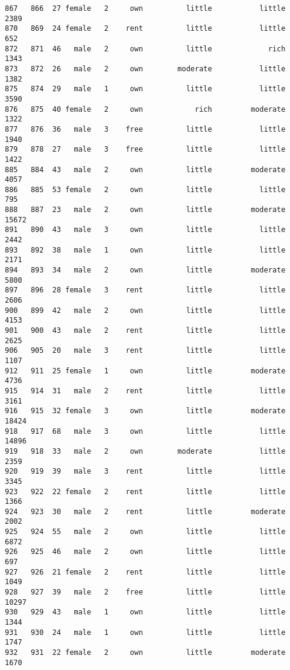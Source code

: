 \documentclass[
]{article}
\begin{document}
\begin{verbatim}
867   866  27 female   2     own          little           little          2389
870   869  24 female   2    rent          little           little           652
872   871  46   male   2     own          little             rich          1343
873   872  26   male   2     own        moderate           little          1382
875   874  29   male   1     own          little           little          3590
876   875  40 female   2     own            rich         moderate          1322
877   876  36   male   3    free          little           little          1940
879   878  27   male   3    free          little           little          1422
885   884  43   male   2     own          little         moderate          4057
886   885  53 female   2     own          little           little           795
888   887  23   male   2     own          little         moderate         15672
891   890  43   male   3     own          little           little          2442
893   892  38   male   1     own          little           little          2171
894   893  34   male   2     own          little         moderate          5800
897   896  28 female   3    rent          little           little          2606
900   899  42   male   2     own          little           little          4153
901   900  43   male   2    rent          little           little          2625
906   905  20   male   3    rent          little           little          1107
912   911  25 female   1     own          little         moderate          4736
915   914  31   male   2    rent          little           little          3161
916   915  32 female   3     own          little         moderate         18424
918   917  68   male   3     own          little           little         14896
919   918  33   male   2     own        moderate           little          2359
920   919  39   male   3    rent          little           little          3345
923   922  22 female   2    rent          little           little          1366
924   923  30   male   2    rent          little         moderate          2002
925   924  55   male   2     own          little           little          6872
926   925  46   male   2     own          little           little           697
927   926  21 female   2    rent          little           little          1049
928   927  39   male   2    free          little           little         10297
930   929  43   male   1     own          little           little          1344
931   930  24   male   1     own          little           little          1747
932   931  22 female   2     own          little         moderate          1670

\end{verbatim}
\end{document}
